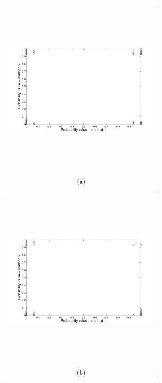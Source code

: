 \documentclass[12pt]{article}
\newcommand{\Pic}[2][0.85]{\begin{center}\texttt{[image: \#2]}
 \end{center} }
\begin{document}
\begin{figure}[H]
    \begin{minipage}[b]{0.6\textwidth}
        \begin{tabular}{c}
       \includegraphics[width=8cm,height=9cm,keepaspectratio]{cloud_Galeras_low.pdf}\\
        (a)
        \end{tabular}
    \end{minipage}
    \begin{minipage}{0.6\textwidth}
        \begin{tabular}{c}
	\includegraphics[width=8cm,height=9cm,keepaspectratio]{cloud_Mammoth_low.pdf}\\
        (b)
        \end{tabular}

\end{minipage}
\end{figure}
\end{document}
